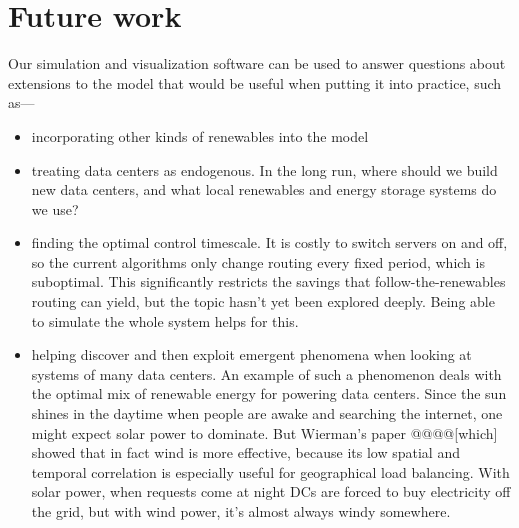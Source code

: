 \documentclass{acm_proc_article-sp}
\begin{document}
\section{Future work}
Our simulation and visualization software can be used to answer questions about extensions to the model that would be useful when putting it into practice, such as—
\begin{itemize}
\item incorporating other kinds of renewables into the model
\item treating data centers as endogenous. In the long run, where should we build new data centers, and what local renewables and energy storage systems do we use?
\item finding the optimal control timescale. It is costly to switch servers on and off, so the current algorithms only change routing every fixed period, which is suboptimal. This significantly restricts the savings that follow-the-renewables routing can yield, but the topic hasn’t yet been explored deeply. Being able to simulate the whole system helps for this.
\item helping discover and then exploit emergent phenomena when looking at systems of many data centers. An example of such a phenomenon deals with the optimal mix of renewable energy for powering data centers. Since the sun shines in the daytime when people are awake and searching the internet, one might expect solar power to dominate. But Wierman’s paper @@@@[which] showed that in fact wind is more effective, because its low spatial and temporal correlation is especially useful for geographical load balancing. With solar power, when requests come at night DCs are forced to buy electricity off the grid, but with wind power, it’s almost always windy somewhere.
\end{itemize}

\printbibliography
\end{document}
